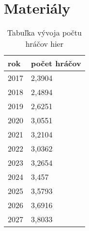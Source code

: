 \documentclass[10pt,slovak,a4paper]{article}
\begin{document}
\section {Materiály} \label{Materials}

\begin{table}[!ht]
    \centering
    \begin{tabular}{|l|l|}
        \hline
        \textbf{rok} & \textbf{počet hráčov} \\ \hline
        2017         & 2,3904                \\ \hline
        2018         & 2,4894                \\ \hline
        2019         & 2,6251                \\ \hline
        2020         & 3,0551                \\ \hline
        2021         & 3,2104                \\ \hline
        2022         & 3,0362                \\ \hline
        2023         & 3,2654                \\ \hline
        2024         & 3,457                 \\ \hline
        2025         & 3,5793                \\ \hline
        2026         & 3,6916                \\ \hline
        2027         & 3,8033                \\ \hline
    \end{tabular}
    \caption{Tabuľka vývoja počtu hráčov hier {\cite{gamers}}}
    \label{gamer_count}
\end{table}




\end{document}
